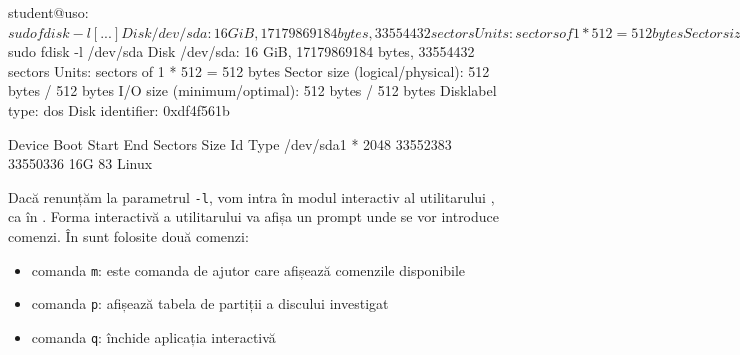 \begin{screen}[caption={Afișarea partițiilor (fdisk)},label={lst:storage:fdisk-list}]
student@uso:~$ sudo fdisk -l
[...]
Disk /dev/sda: 16 GiB, 17179869184 bytes, 33554432 sectors
Units: sectors of 1 * 512 = 512 bytes
Sector size (logical/physical): 512 bytes / 512 bytes
I/O size (minimum/optimal): 512 bytes / 512 bytes
Disklabel type: dos
Disk identifier: 0xdf4f561b

Device     Boot Start      End  Sectors Size Id Type
/dev/sda1  *     2048 33552383 33550336  16G 83 Linux

Disk /dev/sdb: 2 GiB, 2147483648 bytes, 4194304 sectors
Units: sectors of 1 * 512 = 512 bytes
Sector size (logical/physical): 512 bytes / 512 bytes
I/O size (minimum/optimal): 512 bytes / 512 bytes

student@uso:~$ sudo fdisk -l /dev/sda
Disk /dev/sda: 16 GiB, 17179869184 bytes, 33554432 sectors
Units: sectors of 1 * 512 = 512 bytes
Sector size (logical/physical): 512 bytes / 512 bytes
I/O size (minimum/optimal): 512 bytes / 512 bytes
Disklabel type: dos
Disk identifier: 0xdf4f561b

Device     Boot Start      End  Sectors Size Id Type
/dev/sda1  *     2048 33552383 33550336  16G 83 Linux
\end{screen}

Dacă renunțăm la parametrul \texttt{-l}, vom intra în modul interactiv al utilitarului , ca în .
 Forma interactivă a utilitarului va afișa un prompt unde se vor introduce comenzi.
 În  sunt folosite două comenzi:

\begin{itemize}
  \item comanda \texttt{m}: este comanda de ajutor care afișează comenzile disponibile
  \item comanda \texttt{p}: afișează tabela de partiții a discului investigat
  \item comanda \texttt{q}: închide aplicația interactivă 
\end{itemize}

